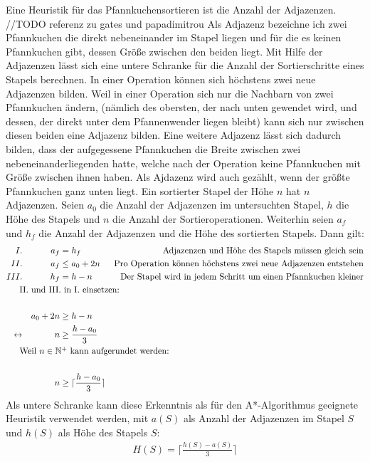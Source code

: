 \documentclass[a4paper,10pt,ngerman]{scrartcl}
\begin{document}
Eine Heuristik für das Pfannkuchensortieren ist die Anzahl der Adjazenzen. //TODO referenz zu gates und papadimitrou Als Adjazenz bezeichne ich zwei
Pfannkuchen die direkt nebeneinander im Stapel liegen und für die es keinen Pfannkuchen gibt, dessen Größe zwischen den beiden liegt.
Mit Hilfe der Adjazenzen lässt sich eine untere Schranke für die Anzahl der Sortierschritte eines Stapels berechnen.
In einer Operation können sich höchstens zwei neue Adjazenzen bilden. Weil in einer Operation sich nur die Nachbarn von zwei
Pfannkuchen ändern, (nämlich des obersten, der nach unten gewendet wird, und dessen, der direkt unter dem Pfannenwender liegen bleibt)
kann sich nur zwischen diesen beiden eine Adjazenz bilden. Eine weitere Adjazenz lässt sich dadurch bilden, dass der aufgegessene
Pfannkuchen die Breite zwischen zwei nebeneinanderliegenden hatte, welche nach der Operation keine Pfannkuchen mit Größe zwischen ihnen haben.
Als Ajdazenz wird auch gezählt, wenn der größte Pfannkuchen ganz unten liegt. Ein sortierter Stapel der Höhe $n$ hat $n$ Adjazenzen.
Seien $a_0$ die Anzahl der Adjazenzen im untersuchten Stapel, $h$ die Höhe des Stapels und $n$ die Anzahl der Sortieroperationen. Weiterhin seien
$a_f$ und $h_f$ die Anzahl der Adjazenzen und die Höhe des sortierten Stapels. Dann gilt:
\begin{align*}
  I.&&a_f &= h_f &\text{Adjazenzen und Höhe des Stapels müssen gleich sein} \\
  II.&&a_f &\leq a_0 + 2n &\text{Pro Operation können höchstens zwei neue Adjazenzen entstehen} \\
  III.&&h_f &= h - n &\text{Der Stapel wird in jedem Schritt um einen Pfannkuchen kleiner}\\
\noalign{II. und III. in I. einsetzen:}\\
  &&a_0 + 2n &\geq h - n &\\
  \leftrightarrow&&n &\geq \frac{h - a_0}{3} \\
\noalign{Weil $n \in \mathbb{N}^+$ kann aufgerundet werden:}\\
&&n &\geq \lceil\frac{h - a_0}{3}\rceil \\
\end{align*}
Als untere Schranke kann diese Erkenntnis als für den A*-Algorithmus geeignete Heuristik verwendet werden,
mit $a(S)$ als Anzahl der Adjazenzen im Stapel $S$ und $h(S)$ als Höhe des Stapels $S$:
\begin{align*}
  H(S) = \lceil\frac{h(S) - a(S)}{3}\rceil 
\end{align*}
\end{document}
